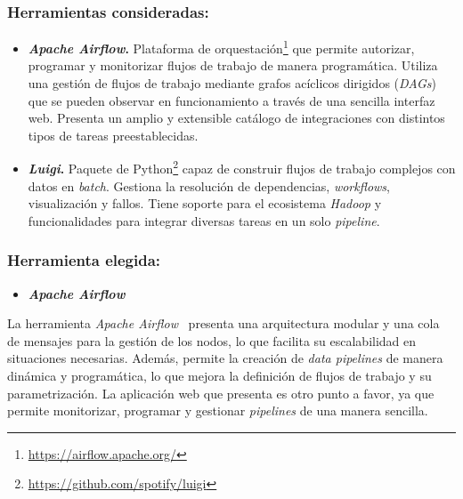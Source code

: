 \subsubsection{Herramientas consideradas:}

\begin{itemize}
    \item \textbf{\textit{Apache Airflow}.} Plataforma de orquestación\footnote{\url{https://airflow.apache.org/}} que permite autorizar, programar y monitorizar flujos de trabajo de manera programática. Utiliza una gestión de flujos de trabajo mediante grafos acíclicos dirigidos (\textit{DAGs}) que se pueden observar en funcionamiento a través de una sencilla interfaz web. Presenta un amplio y extensible catálogo de integraciones con distintos tipos de tareas preestablecidas.
    
    \item \textbf{\textit{Luigi}.} Paquete de Python\footnote{\url{https://github.com/spotify/luigi}} capaz de construir flujos de trabajo complejos con datos en \textit{batch}. Gestiona la resolución de dependencias, \textit{workflows}, visualización y fallos. Tiene soporte para el ecosistema \textit{Hadoop} y funcionalidades para integrar diversas tareas en un solo \textit{pipeline}.
\end{itemize}

\vspace{2cm}

\subsubsection{Herramienta elegida:}

\begin{itemize}
    \item \textbf{\textit{Apache Airflow}}
\end{itemize}

La herramienta \textit{Apache Airflow}~\cite{apacheAirflow} presenta una arquitectura modular y una cola de mensajes para la gestión de los nodos, lo que facilita su escalabilidad en situaciones necesarias. Además, permite la creación de \textit{data pipelines} de manera dinámica y programática, lo que mejora la definición de flujos de trabajo y su parametrización. La aplicación web que presenta es otro punto a favor, ya que permite monitorizar, programar y gestionar \textit{pipelines} de una manera sencilla.

